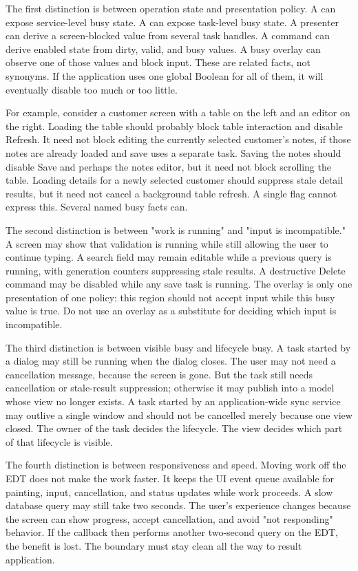 The first distinction is between operation state and presentation policy. A
 can expose service-level busy state. A  can
expose task-level busy state. A presenter can derive a screen-blocked value
from several task handles. A command can derive enabled state from dirty,
valid, and busy values. A busy overlay can observe one of those values and
block input. These are related facts, not synonyms. If the application uses one
global Boolean for all of them, it will eventually disable too much or too
little.

For example, consider a customer screen with a table on the left and an editor
on the right. Loading the table should probably block table interaction and
disable Refresh. It need not block editing the currently selected customer's
notes, if those notes are already loaded and save uses a separate task.
Saving the notes should disable Save and perhaps the notes editor, but it need
not block scrolling the table. Loading details for a newly selected customer
should suppress stale detail results, but it need not cancel a background table
refresh. A single  flag cannot express this. Several named busy facts
can.

The second distinction is between "work is running" and "input is incompatible."
A screen may show that validation is running while still allowing the user to
continue typing. A search field may remain editable while a previous query is
running, with generation counters suppressing stale results. A destructive
Delete command may be disabled while any save task is running. The overlay is
only one presentation of one policy: this region should not accept input while
this busy value is true. Do not use an overlay as a substitute for deciding
which input is incompatible.

The third distinction is between visible busy and lifecycle busy. A task
started by a dialog may still be running when the dialog closes. The user may
not need a cancellation message, because the screen is gone. But the task
still needs cancellation or stale-result suppression; otherwise it may publish
into a model whose view no longer exists. A task started by an application-wide
sync service may outlive a single window and should not be cancelled merely
because one view closed. The owner of the task decides the lifecycle. The view
decides which part of that lifecycle is visible.

The fourth distinction is between responsiveness and speed. Moving work off
the EDT does not make the work faster. It keeps the UI event queue available
for painting, input, cancellation, and status updates while work proceeds. A
slow database query may still take two seconds. The user's experience changes
because the screen can show progress, accept cancellation, and avoid "not
responding" behavior. If the callback then performs another two-second query
on the EDT, the benefit is lost. The boundary must stay clean all the way to
result application.

